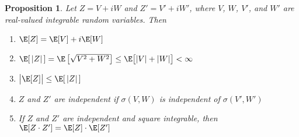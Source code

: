 \documentclass[12pt]{article}
\theoremstyle{plain}
\newtheorem{prop}[thm]{Proposition}
\theoremstyle{definition}
\theoremstyle{remark}
\begin{document}
\begin{prop}
Let $Z = V+iW$ and $Z' = V'+iW'$, where $V$, $W$, $V'$, and $W'$ are
real-valued integrable random variables. Then
\begin{enumerate}[label=\emph{(\roman*)}]
  \item $\E[Z] = \E[V] + i\E[W]$
  \item $\E[\,|Z|\,] = \E\left[\sqrt{V^2 + W^2}\right] \leq
    \E\big[|V|+|W|\big]<\infty$
  \item $\big|\E[Z]\big|\leq \E[\,|Z|\,]$
  \item $Z$ and $Z'$ are independent if $\sigma(V,W)$ is independent of
    $\sigma(V',W')$
  \item If $Z$ and $Z'$ are independent and square integrable, then
    $\E[Z\cdot Z'] = \E[Z]\cdot\E[Z']$
\end{enumerate}
\end{prop}
\end{document}
